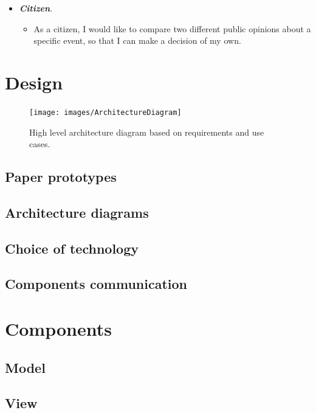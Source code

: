 \documentclass{l4proj}
\begin{document}
\begin{itemize}
	\item \textbf{\textit{Citizen}}.
	\begin{itemize}
		\item As a citizen, I would like to compare two different public opinions about a specific event, so that I can make a decision of my own. 
	\end{itemize}
\end{itemize}

\chapter{Design}

\begin{figure}[H]
	\centering
	\texttt{[image: images/ArchitectureDiagram]}
	\caption{High level architecture diagram based on requirements and use cases.}
	\label{projectInitial}
\end{figure}

\section{Paper prototypes}

\section{Architecture diagrams}

\section{Choice of technology}

\section{Components communication}

\chapter{Components}

\section{Model}

\section{View}
\end{document}
